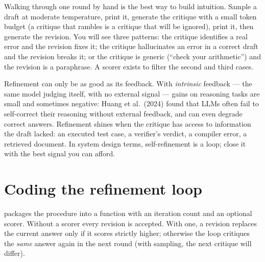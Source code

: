 Walking through one round by hand is the best way to build intuition. Sample a draft at moderate
temperature, print it, generate the critique with a small token budget (a critique that rambles is a
critique that will be ignored), print it, then generate the revision. You will see three patterns:
the critique identifies a real error and the revision fixes it; the critique hallucinates an error
in a correct draft and the revision breaks it; or the critique is generic (``check your arithmetic'')
and the revision is a paraphrase. A scorer exists to filter the second and third cases.

\begin{keyidea}
Refinement can only be as good as its feedback. With \emph{intrinsic} feedback --- the same model
judging itself, with no external signal --- gains on reasoning tasks are small and sometimes negative:
Huang et al.\ (2024) found that LLMs often fail to self-correct their reasoning without external
feedback, and can even degrade correct answers. Refinement shines when the critique has access to
information the draft lacked: an executed test case, a verifier's verdict, a compiler error, a
retrieved document. In system design terms, self-refinement is a loop; close it with the best
signal you can afford.
\end{keyidea}

\section{Coding the refinement loop}\label{sec:refine:loopcode}


 packages the procedure into a function with an iteration count and an optional
scorer. Without a scorer every revision is accepted. With one, a revision replaces the current answer
only if it scores strictly higher; otherwise the loop critiques the \emph{same} answer again in the
next round (with sampling, the next critique will differ).

